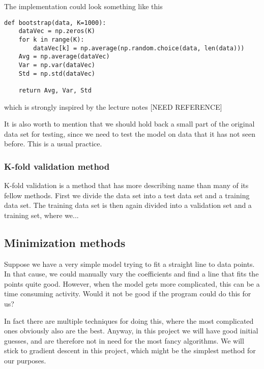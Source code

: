 The implementation could look something like this
\lstset{basicstyle=\scriptsize}
\begin{lstlisting}
def bootstrap(data, K=1000):
    dataVec = np.zeros(K)
    for k in range(K):
        dataVec[k] = np.average(np.random.choice(data, len(data)))
    Avg = np.average(dataVec)
    Var = np.var(dataVec)
    Std = np.std(dataVec)
    
    return Avg, Var, Std
\end{lstlisting}
which is strongly inspired by the lecture notes [NEED REFERENCE]

It is also worth to mention that we should hold back a small part of the original data set for testing, since we need to test the model on data that it has not seen before. This is a usual practice. 

\subsubsection{K-fold validation method} \label{sec:kfold}
K-fold validation is a method that has more describing name than many of its fellow methods. First we divide the data set into a test data set and a training data set. The training data set is then again divided into a validation set and a training set, where we...

\subsection{Minimization methods} \label{sec:minimization}
Suppose we have a very simple model trying to fit a straight line to data points. In that cause, we could manually vary the coefficients and find a line that fits the points quite good. However, when the model gets more complicated, this can be a time consuming activity. Would it not be good if the program could do this for us?

In fact there are multiple techniques for doing this, where the most complicated ones obviously also are the best. Anyway, in this project we will have good initial guesses, and are therefore not in need for the most fancy algorithms. We will stick to gradient descent in this project, which might be the simplest method for our purposes.

